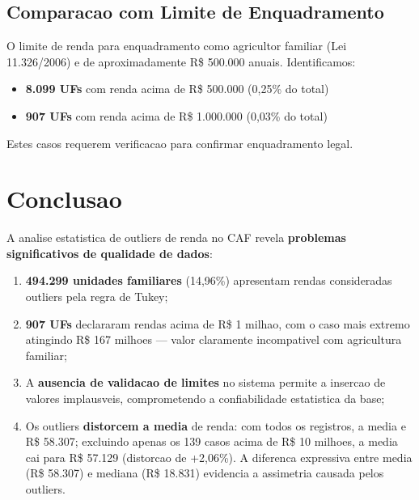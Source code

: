 \documentclass[11pt,a4paper]{article}
\begin{document}
\subsection{Comparacao com Limite de Enquadramento}

O limite de renda para enquadramento como agricultor familiar (Lei 11.326/2006) e de
aproximadamente R\$ 500.000 anuais. Identificamos:

\begin{itemize}
    \item \textbf{8.099 UFs} com renda acima de R\$ 500.000 (0,25\% do total)
    \item \textbf{907 UFs} com renda acima de R\$ 1.000.000 (0,03\% do total)
\end{itemize}

Estes casos requerem verificacao para confirmar enquadramento legal.

\section{Conclusao}

A analise estatistica de outliers de renda no CAF revela \textbf{problemas significativos
de qualidade de dados}:

\begin{enumerate}
    \item \textbf{494.299 unidades familiares} (14,96\%) apresentam rendas consideradas
    outliers pela regra de Tukey;

    \item \textbf{907 UFs} declararam rendas acima de R\$ 1 milhao, com o caso mais
    extremo atingindo R\$ 167 milhoes --- valor claramente incompativel com agricultura
    familiar;

    \item A \textbf{ausencia de validacao de limites} no sistema permite a insercao de
    valores implausveis, comprometendo a confiabilidade estatistica da base;

    \item Os outliers \textbf{distorcem a media} de renda: com todos os registros,
    a media e R\$ 58.307; excluindo apenas os 139 casos acima de R\$ 10 milhoes,
    a media cai para R\$ 57.129 (distorcao de +2,06\%). A diferenca expressiva
    entre media (R\$ 58.307) e mediana (R\$ 18.831) evidencia a assimetria causada
    pelos outliers.
\end{enumerate}
\end{document}
